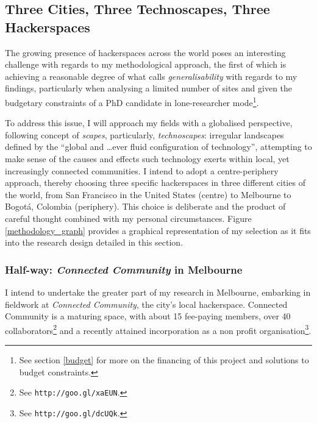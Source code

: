 
\subsection{Three Cities, Three Technoscapes, Three Hackerspaces}
\label{methods}

The growing presence of hackerspaces across the world poses an interesting challenge with regards to my methodological approach, the first of which is achieving a reasonable degree of what \citet{silverman00} calls \textit{generalisability} with regards to my findings, particularly when analysing a limited number of sites and given the budgetary constraints of a PhD candidate in lone-researcher mode\footnote{See section \ref{budget} for more on the financing of this project and solutions to budget constraints.}.

To address this issue, I will approach my fields with a globalised perspective, following  concept of \textit{scapes}, particularly, \textit{tech\-no\-scapes}:  irregular landscapes defined by the ``global and \ldots ever fluid configuration of technology'', attempting to make sense of the causes and effects such technology exerts within local, yet increasingly connected communities. I intend to adopt a centre-periphery approach, thereby choosing three specific hackerspaces in three different cities of the world, from San Francisco in the United States (centre) to Melbourne to Bogot\'{a}, Colombia (periphery). This choice is deliberate and the product of careful thought combined with my personal circumstances. Figure \ref{methodology_graph} provides a graphical representation of my selection as it fits into the research design detailed in this section.

\subsubsection{Half-way: \textit{Connected Community} in Melbourne}

I intend to undertake the greater part of my research in Melbourne, embarking in fieldwork at \textit{Connected Community}, the city's local hackerspace. Connected Community is a maturing space, with about 15 fee-paying members, over 40 collaborators\footnote{See \texttt{http://goo.gl/xaEUN}.} and a recently attained incorporation as a non profit organisation\footnote{See \texttt{http://goo.gl/dcUQk}.}.


